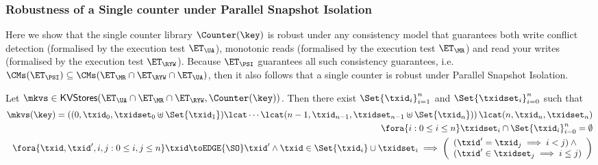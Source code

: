 \subsubsection{Robustness of a Single counter under Parallel Snapshot Isolation}
Here we show that the  single counter library $\Counter(\key)$ is robust under any consistency model 
that guarantees both write conflict detection (formalised by the execution test 
$\ET_{\UA}$), monotonic reads (formalised by the execution test $\ET_{\MR}$) 
and read your writes (formalised by the execution test $\ET_{\RYW}$). 
Because $\ET_{\PSI}$ guarantees all such consistency guarantees, i.e. 
$\CMs(\ET_{\PSI}) \subseteq \CMs(\ET_{\MR} \cap \ET_{\RYW} \cap \ET_{\UA})$, 
then it also follows that a single counter is robust under Parallel Snapshot Isolation.
\begin{proposition}
\label{prop:counter_hhshape}
Let $\mkvs \in \mathsf{KVStores}(\ET_{\UA} \cap \ET_{\MR} \cap \ET_{\RYW}, \Counter(\key))$. 
Then there exist $\Set{\txid_i}_{i = 1}^{n}$ and $\Set{\txidset_{i}}_{i = 0}^{n}$ such that 
\begin{align}
\mkvs(\key) = \left( (0, \txid_{0}, \txidset_{0} \uplus \Set{\txid_1}) \lcat \cdots \lcat (n-1, \txid_{n-1}, \txidset_{n-1} \uplus \Set{\txid_{n}}) \right) 
\lcat (n, \txid_{n}, \txidset_{n}) \label{eq:psi_counter_shape}\\
\fora{ i : 0 \leq i \leq n } \txidset_{i} \cap \Set{\txid_{i}}_{i=0}^{n} = \emptyset \label{eq:psi_counter_rwtxs}\\
\fora{ \txid, \txid', i,j: 0 \leq i,j \leq n } \txid \toEDGE{\SO} \txid' 
\land \txid \in \Set{\txid_{i}} \cup \txidset_{i} \implies 
\left(\begin{array}{l}
(\txid' = \txid_{j} \implies i < j) \land {} \\
(\txid' \in \txidset_{j} \implies i \leq j) \\
\end{array}\right) \label{eq:psi_counter_so}
\end{align}
%
%
%
\end{proposition}

